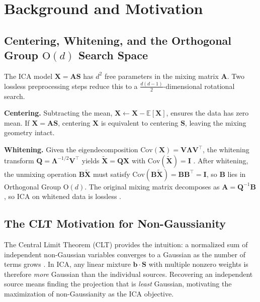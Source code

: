 \documentclass{tpm2026} %
\begin{document}
\section{Background and Motivation}
\label{app:info_geometry}

\subsection{Centering, Whitening, and the Orthogonal Group $\mathrm{O}(d)$ Search Space}

The ICA model $\mathbf{X} = \mathbf{A}\mathbf{S}$ has $d^2$ free parameters in the mixing matrix $\mathbf{A}$.
Two lossless preprocessing steps reduce this to a $\tfrac{d(d-1)}{2}$-dimensional rotational search.

\textbf{Centering.} Subtracting the mean, $\mathbf{X} \gets \mathbf{X} - \mathbb{E}[\mathbf{X}]$, ensures the data has zero mean.
If $\mathbf{X} = \mathbf{A}\mathbf{S}$, centering $\mathbf{X}$ is equivalent to centering $\mathbf{S}$, leaving the mixing geometry intact.

\textbf{Whitening.} Given the eigendecomposition $\mathrm{Cov}(\mathbf{X}) = \mathbf{V}\boldsymbol{\Lambda}\mathbf{V}^\top$, the whitening transform $\mathbf{Q} = \boldsymbol{\Lambda}^{-1/2}\mathbf{V}^\top$ yields $\widetilde{\mathbf{X}} = \mathbf{Q}\mathbf{X}$ with $\mathrm{Cov}(\widetilde{\mathbf{X}}) = \mathbf{I}$ \citep{hyvarinen2001}.
After whitening, the unmixing operation $\mathbf{B}\widetilde{\mathbf{X}}$ must satisfy $\mathrm{Cov}(\mathbf{B}\widetilde{\mathbf{X}}) = \mathbf{B}\mathbf{B}^\top = \mathbf{I}$, so $\mathbf{B}$ lies in Orthogonal Group $\mathrm{O}(d)$.
The original mixing matrix decomposes as $\mathbf{A} = \mathbf{Q}^{-1}\mathbf{B}$, so ICA on whitened data is lossless \citep{cardoso2022}.

\subsection{The CLT Motivation for Non-Gaussianity}

The Central Limit Theorem (CLT) provides the intuition: a normalized sum of independent non-Gaussian variables converges to a Gaussian as the number of terms grows \citep{hyvarinen2001}. In ICA, any linear mixture $\mathbf{b}\cdot\mathbf{S}$ with multiple nonzero weights is therefore \emph{more} Gaussian than the individual sources. Recovering an independent source means finding the projection that is \emph{least} Gaussian, motivating the maximization of non-Gaussianity as the ICA objective.
\end{document}
